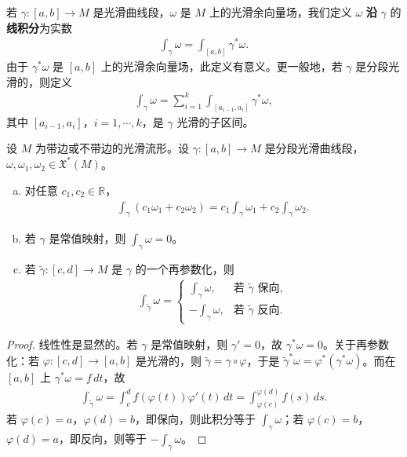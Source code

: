 \documentclass[../../main.tex]{subfiles}
\begin{document}
若 $\gamma\colon[a,b]\to M$ 是光滑曲线段，$\omega$ 是 $M$ 上的光滑余向量场，我们定义 $\omega$ \textbf{沿} $\gamma$ 的\textbf{线积分}为实数
\begin{align}
\int_\gamma\omega=\int_{[a,b]}\gamma^*\omega.\label{align:ch11-线积分定义}
\end{align}
由于 $\gamma^*\omega$ 是 $[a,b]$ 上的光滑余向量场，此定义有意义。更一般地，若 $\gamma$ 是分段光滑的，则定义
\begin{align}
\int_\gamma\omega=\sum_{i=1}^k\int_{[a_{i-1},a_i]}\gamma^*\omega,\label{align:ch11-分段线积分}
\end{align}
其中 $[a_{i-1},a_i]$，$i=1,\cdots ,k$，是 $\gamma$ 光滑的子区间。

\begin{proposition}[线积分的性质]\label{proposition:ch11-线积分性质}
设 $M$ 为带边或不带边的光滑流形。设 $\gamma\colon[a,b]\to M$ 是分段光滑曲线段，$\omega,\omega_1,\omega_2\in\mathfrak X^*(M)$。
\begin{enumerate}[(a)]
\item 对任意 $c_1,c_2\in\mathbb{R}$，
\begin{align*}
\int_\gamma(c_1\omega_1+c_2\omega_2)=c_1\int_\gamma\omega_1+c_2\int_\gamma\omega_2.
\end{align*}
\item 若 $\gamma$ 是常值映射，则 $\int_\gamma\omega=0$。
\item 若 $\widetilde\gamma\colon[c,d]\to M$ 是 $\gamma$ 的一个再参数化，则
\begin{align*}
\int_{\widetilde\gamma}\omega=
\begin{cases}
\int_\gamma\omega,&\text{若 }\widetilde\gamma\text{ 保向},\\
-\int_\gamma\omega,&\text{若 }\widetilde\gamma\text{ 反向}.
\end{cases}
\end{align*}
\end{enumerate}
\end{proposition}

\begin{proof}
线性性是显然的。若 $\gamma$ 是常值映射，则 $\gamma'=0$，故 $\gamma^*\omega=0$。关于再参数化：若 $\varphi\colon[c,d]\to[a,b]$ 是光滑的，则 $\widetilde\gamma=\gamma\circ\varphi$，于是 $\widetilde\gamma^*\omega=\varphi^*(\gamma^*\omega)$。而在 $[a,b]$ 上 $\gamma^*\omega=f\,dt$，故
\begin{align*}
\int_{\widetilde\gamma}\omega=\int_c^d f(\varphi(t))\varphi'(t)\,dt=\int_{\varphi(c)}^{\varphi(d)}f(s)\,ds.
\end{align*}
若 $\varphi(c)=a$，$\varphi(d)=b$，即保向，则此积分等于 $\int_\gamma\omega$；若 $\varphi(c)=b$，$\varphi(d)=a$，即反向，则等于 $-\int_\gamma\omega$。
\end{proof}
\end{document}
